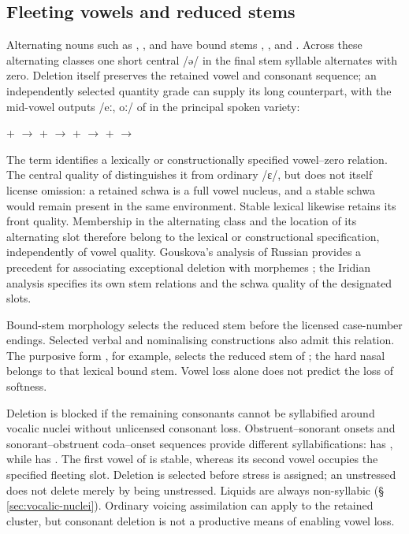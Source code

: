 \subsection{Fleeting vowels and reduced stems}\label{sec:vowel-zero}

Alternating nouns such as , , and  have
bound stems , , and . Across these alternating classes one
short central  /ə/ in the final stem syllable alternates with zero.
Deletion itself preserves the retained vowel and consonant sequence;
an independently selected quantity grade can supply its long counterpart,
with the mid-vowel outputs /eː, oː/ of  in the principal
spoken variety:

\pex
\a {} +  $\rightarrow$ 
\a {} +  $\rightarrow$ 
\a {} +  $\rightarrow$ 
\a {} +  $\rightarrow$ 
\xe

The term  identifies a lexically or constructionally specified
vowel--zero relation. The central quality of  distinguishes it from
ordinary  /ɛ/, but does not itself license omission: a retained
schwa is a full vowel nucleus, and a stable schwa would remain present in
the same environment. Stable lexical  likewise retains its front
quality. Membership in the alternating class and the location of its
alternating slot therefore belong to the lexical or constructional
specification, independently of vowel quality. Gouskova's analysis of
Russian provides a precedent for associating exceptional deletion with
morphemes \cite[§~4.1]{gouskova2012}; the Iridian analysis specifies its own
stem relations and the schwa quality of the designated slots.

Bound-stem morphology selects the reduced stem before the licensed case-number
endings. Selected verbal and
nominalising constructions also admit this relation. The purposive form
, for example, selects the reduced stem  of
; the hard nasal belongs to that lexical bound stem. Vowel loss
alone does not predict the loss of softness.

Deletion is blocked if the remaining consonants cannot be syllabified around
vocalic nuclei without unlicensed consonant loss. Obstruent--sonorant onsets
and sonorant--obstruent coda--onset sequences provide different syllabifications:
 has , while  has . The first
vowel of  is stable, whereas its second vowel occupies the
specified fleeting slot. Deletion is selected before stress is assigned;
an unstressed  does not delete merely by being unstressed.
Liquids are always
non-syllabic (§\,\ref{sec:vocalic-nuclei}). Ordinary voicing assimilation can
apply to the retained cluster, but consonant deletion is not a productive means
of enabling vowel loss.

